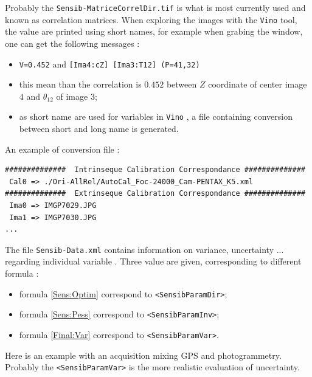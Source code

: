 Probably the {\tt Sensib-MatriceCorrelDir.tif} is what  is most currently used
and known as correlation matrices. When exploring the images with the {\tt Vino}
tool, the value are printed using short names, for example when grabing the 
window, one can get the following messages :


\begin{itemize}
     \item {\tt V=0.452} and {\tt [Ima4:cZ] [Ima3:T12] (P=41,32)}
     \item this mean than the correlation is $0.452$ between $Z$ coordinate of center
           image $4$  and $\theta_{12}$ of image $3$;
      \item as short name are used for variables in {\tt Vino} , a file containing conversion
            between short and long name is generated.
\end{itemize}


An example of conversion file :

\begin{verbatim}
##############  Intrinseque Calibration Correspondance ##############
 Cal0 => ./Ori-AllRel/AutoCal_Foc-24000_Cam-PENTAX_K5.xml
##############  Extrinseque Calibration Correspondance ##############
 Ima0 => IMGP7029.JPG
 Ima1 => IMGP7030.JPG
...
\end{verbatim}

The file {\tt Sensib-Data.xml} contains information on  variance, uncertainty  ...
regarding individual variable . Three value are given, corresponding
to different formula  :

\begin{itemize}
    \item formula \ref{Sens:Optim}  correspond to {\tt <SensibParamDir>};
    \item formula \ref{Sens:Pess}   correspond to {\tt <SensibParamInv>};
    \item formula \ref{Final:Var}   correspond to {\tt <SensibParamVar>}.
\end{itemize}

Here is an example with an acquisition mixing GPS and photogrammetry. Probably the
 {\tt <SensibParamVar>} is the more realistic evaluation of uncertainty.

